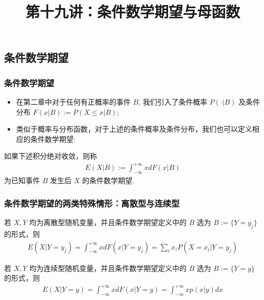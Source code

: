 \title[概率论]{第十九讲：条件数学期望与母函数}
\date{}

{ 
	\begin{frame}
		\titlepage
	\end{frame}
}


\subsection{条件数学期望}
\begin{frame}
	\frametitle{条件数学期望}
	\begin{itemize}[<+-|alert@+>]
		\item 在第二章中对于任何有正概率的事件 $B$, 我们引入了条件概率 $P (\cdot|B)$ 及条件分布 $F (x|B):=P (X\le x|B)$;
		\item 类似于概率与分布函数，对于上述的条件概率及条件分布，我们也可以定义相应的条件数学期望:


	\end{itemize}
	\begin{defi}
		如果下述积分绝对收敛，则称
		\begin{eqnarray*}
			E(X|B):=\int_{-\infty}^{+\infty}xdF(x|B)
		\end{eqnarray*}
		为已知事件 $B$ 发生后 $X$ 的条件数学期望.
	\end{defi}
\end{frame}

\begin{frame}
	\frametitle{条件数学期望的两类特殊情形：离散型与连续型}
	\begin{thm}
		若 $X,Y$ 均为离散型随机变量，并且条件数学期望定义中的 $B$ 选为 $B:=\{Y=y_j\}$ 的形式，则
		\begin{eqnarray*}
			E(X|Y=y_j)=\int_{-\infty}^{+\infty}xdF(x|Y=y_j)=\sum_{i}x_iP(X=x_i|Y=y_j)
		\end{eqnarray*}

	\end{thm}
	\pause
	\begin{thm}
		若 $X,Y$ 均为连续型随机变量，并且条件数学期望定义中的 $B$ 选为 $B:=\{Y=y\}$ 的形式，则
		\begin{eqnarray*}
			E(X|Y=y)=\int_{-\infty}^{+\infty}xdF(x|Y=y)=\int_{-\infty}^{+\infty}xp(x|y)dx
		\end{eqnarray*}
	\end{thm}

\end{frame}


